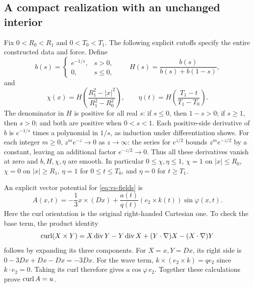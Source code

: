 \subsection{A compact realization with an unchanged interior}

Fix $0<R_0<R_1$ and $0<T_0<T_1$. The following explicit cutoffs specify
the entire constructed data and force. Define
\[
 b(s)=\begin{cases}e^{-1/s},&s>0,\\0,&s\leq0,\end{cases}
 \qquad H(s)=\frac{b(s)}{b(s)+b(1-s)},
\]
and
\begin{equation}\label{eq:vs-cutoffs}
 \chi(x)=H\left(\frac{R_1^2-|x|^2}{R_1^2-R_0^2}\right),
 \qquad
 \eta(t)=H\left(\frac{T_1-t}{T_1-T_0}\right).
\end{equation}
The denominator in $H$ is positive for all real $s$: if $s\leq0$,
then $1-s>0$; if $s\geq1$, then $s>0$; and both are positive when
$0<s<1$. Each positive-side derivative of $b$ is $e^{-1/s}$ times
a polynomial in $1/s$, as induction under differentiation shows.
For each integer $m\geq0$, $z^me^{-z}\to0$ as $z\to\infty$:
the series for $e^{z/2}$ bounds $z^m e^{-z/2}$ by a constant, leaving
an additional factor $e^{-z/2}\to0$. Thus all these derivatives
vanish at zero and $b,H,\chi,\eta$ are smooth. In particular
$0\leq\chi,\eta\leq1$, $\chi=1$ on $|x|\leq R_0$, $\chi=0$
on $|x|\geq R_1$, $\eta=1$ for $0\leq t\leq T_0$, and
$\eta=0$ for $t\geq T_1$.

An explicit vector potential for \eqref{eq:vs-fields} is
\begin{equation}\label{eq:vs-potential}
 A(x,t)=-\frac13x\times(Dx)
       +\frac{a(t)}{q(t)}(e_2\times k(t))\sin\varphi(x,t).
\end{equation}
Here the curl orientation is the original right-handed Cartesian one.
To check the base term, the product identity
\[
 \operatorname{curl}(X\times Y)=X\operatorname{div}Y
 -Y\operatorname{div}X+(Y\cdot\nabla)X-(X\cdot\nabla)Y
\]
follows by expanding its three components. For $X=x,Y=Dx$, its
right side is $0-3Dx+Dx-Dx=-3Dx$. For the wave term,
$k\times(e_2\times k)=q e_2$ since $k\cdot e_2=0$.
Taking its curl therefore gives $a\cos\varphi\,e_2$.
Together these calculations prove $\operatorname{curl} A=u$.

